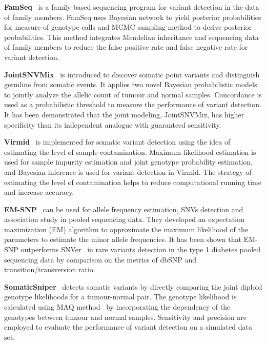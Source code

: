 \documentclass[a4,center,fleqn]{NAR}
\begin{document}
\textbf{FamSeq}~\citep{Peng2013} is a family-based sequencing program for variant detection in the data of family members.
FamSeq uses Bayesian network to yield posterior probabilities for measure of genotype calls and MCMC sampling method to derive posterior probabilities.
This method integrates Mendelian inheritance and sequencing data of family members to reduce the false positive rate and false negative rate for variant detection.

\textbf{JointSNVMix}~\citep{Roth2012} is introduced to discover somatic point variants and distinguish germline from somatic events.
It applies two novel Bayesian probabilistic models to jointly analyze the allelic count of tumour and normal samples.
Concordance is used as a probabilistic threshold to measure the performance of variant detection.
It has been demonstrated that the joint modeling, JointSNVMix, has higher specificity than its independent analogue with guaranteed sensitivity.

\textbf{Virmid}~\citep{Kim2013} is implemented for somatic variant detection using the idea of estimating the level of sample contamination.
Maximum likelihood estimation is used for sample impurity estimation and joint genotype probability estimation, and Bayesian inference is used for variant detection in Virmid.
The strategy of estimating the level of contamination helps to reduce computational running time and increase accuracy.

\textbf{EM-SNP}~\citep{Chen2013} can be used for allele frequency estimation, SNVs detection and association study in pooled sequencing data.
They developed an expectation maximization (EM) algorithm to approximate the maximum likelihood of the parameters to estimate the minor allele frequencies.
It has been shown that EM-SNP outperforms SNVer~\citep{Wei2011} in rare variants detection in the type 1 diabetes pooled sequencing data by comparison on the metrics of dbSNP and transition/transversion ratio.

\textbf{SomaticSniper}~\citep{Larson2012} detects somatic variants by directly comparing the joint diploid genotype likelihoods for a tumour-normal pair.
The genotype likelihood is calculated using MAQ method~\citep{Li2008} by incorporating the dependency of the genotypes between tumour and normal samples.
Sensitivity and precision are employed to evaluate the performance of variant detection on a simulated data set.
\end{document}
